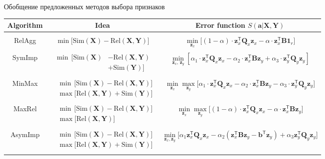 \documentclass[9pt]{beamer}
\newcommand{\bz}{\mathbf{z}}
\newcommand{\ba}{\mathbf{a}}
\newcommand{\bb}{\mathbf{b}}
\newcommand{\bY}{\mathbf{Y}}
\newcommand{\bX}{\mathbf{X}}
\newcommand{\bB}{\mathbf{B}}
\newcommand{\bQ}{\mathbf{Q}}
\newcommand{\bOne}{\boldsymbol{1}}
\newcommand{\T}{\mathsf{T}}
\begin{document}
\begin{frame}{Обобщение предложенных методов выбора признаков}
\begin{table}
	\centering
	\footnotesize{
		\begin{tabular}{c|c|c}
			\hline
			Algorithm & Idea & Error function $S(\ba | \bX, \bY)$ \\
			\hline && \\ 
			RelAgg & $\min \bigl[ \text{Sim}(\bX) - \text{Rel}(\bX, \bY) \bigr] $ & $\min\limits_{\bz_x} \bigl[ (1 - \alpha) \cdot \bz_x^{\T} \bQ_x \bz_x - \alpha \cdot \bz_x^{\T} \bB \bOne_r \bigr] $ \\ &&\\
			SymImp & $\begin{aligned} \min \, \bigl[ \text{Sim}(\bX) & - \text{Rel}(\bX, \bY) \\ & + \text{Sim}(\bY) \bigr] \end{aligned}$ & $ \min\limits_{\bz_x, \, \bz_y} \left[ \alpha_1 \cdot \bz_x^{\T} \bQ_x \bz_x - \alpha_2 \cdot \bz_x^{\T} \bB \bz_y + \alpha_3 \cdot \bz_y^{\T} \bQ_y \bz_y \right] $\\ &&\\ 
			MinMax & $\begin{aligned} &\min \, \bigl[ \text{Sim}(\bX) - \text{Rel}(\bX, \bY) \bigr]  \\ & \max \bigl[\text{Rel}(\bX, \bY) + \text{Sim}(\bY) \bigr] \end{aligned}$ & $	\min\limits_{\bz_x} 	\max\limits_{\bz_y} \bigl[\alpha_1 \cdot \bz_x^{\T} \bQ_x \bz_x - \alpha_2 \cdot \bz_x^{\T} \bB \bz_y - \alpha_3 \cdot \bz_y^{\T} \bQ_y \bz_y \bigr]$ \\ &&\\ 
			MaxRel & $\begin{aligned} &\min \, \bigl[ \text{Sim}(\bX) - \text{Rel}(\bX, \bY) \bigr]  \\ & \max \bigl[\text{Rel}(\bX, \bY) \bigr] \end{aligned}$& $\min\limits_{\bz_x} 	\max\limits_{\bz_y} \bigl[ (1 - \alpha) \cdot \bz_x^{\T} \bQ_x \bz_x - \alpha \cdot \bz_x^{\T} \bB \bz_y \bigr]$ \\ 		&&\\
			AsymImp & $\begin{aligned} & \min \, \bigl[ \text{Sim}(\bX) - \text{Rel}(\bX, \bY) \bigr]\\ &  \max \bigl[\text{Rel}(\bX, \bY) + \text{Sim}(\bY) \bigr] \end{aligned}$ & $\min\limits_{\bz_x, \bz_y} \bigl[ \alpha_1 \bz_x^{\T} \bQ_x \bz_x - \alpha_2 \left(\bz_x^{\T} \bB \bz_y - \bb^{\T} \bz_y \right) + \alpha_3  \bz_y^{\T} \bQ_y \bz_y \bigr]$\\  && \\
			\hline
	\end{tabular}}
\end{table}
\end{frame}
\end{document}
